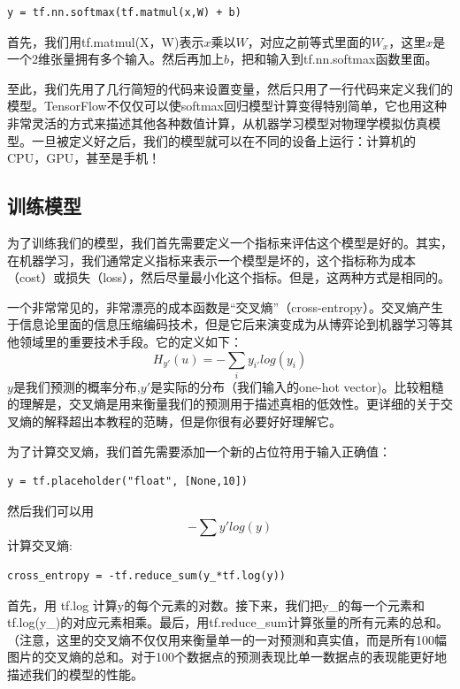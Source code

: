 \documentclass[a4paper,11pt,twoside]{ctexbook}
\begin{document}
\begin{lstlisting}
y = tf.nn.softmax(tf.matmul(x,W) + b)
\end{lstlisting}

首先，我们用tf.matmul(X，W)表示$x$乘以$W$，对应之前等式里面的$W_x$，这里$x$是一个2维张量拥有多个输入。然后再加上$b$，把和输入到tf.nn.softmax函数里面。

至此，我们先用了几行简短的代码来设置变量，然后只用了一行代码来定义我们的模型。TensorFlow不仅仅可以使softmax回归模型计算变得特别简单，它也用这种非常灵活的方式来描述其他各种数值计算，从机器学习模型对物理学模拟仿真模型。一旦被定义好之后，我们的模型就可以在不同的设备上运行：计算机的CPU，GPU，甚至是手机！

\subsection{训练模型}
为了训练我们的模型，我们首先需要定义一个指标来评估这个模型是好的。其实，在机器学习，我们通常定义指标来表示一个模型是坏的，这个指标称为成本（cost）或损失（loss），然后尽量最小化这个指标。但是，这两种方式是相同的。

一个非常常见的，非常漂亮的成本函数是“交叉熵”（cross-entropy）。交叉熵产生于信息论里面的信息压缩编码技术，但是它后来演变成为从博弈论到机器学习等其他领域里的重要技术手段。它的定义如下：
\begin{equation}
H_{y'}(u) = -\sum_i{y_{i'}log(y_i)}
\end{equation}
$y$是我们预测的概率分布,$y'$是实际的分布（我们输入的one-hot vector)。比较粗糙的理解是，交叉熵是用来衡量我们的预测用于描述真相的低效性。更详细的关于交叉熵的解释超出本教程的范畴，但是你很有必要好好理解它。

为了计算交叉熵，我们首先需要添加一个新的占位符用于输入正确值：
\begin{lstlisting}
y = tf.placeholder("float", [None,10])
\end{lstlisting}
然后我们可以用
\begin{equation}
-\sum{y'log(y)}
\end{equation}
计算交叉熵:

\begin{lstlisting}
cross_entropy = -tf.reduce_sum(y_*tf.log(y))
\end{lstlisting}

首先，用 tf.log 计算y的每个元素的对数。接下来，我们把y\_的每一个元素和tf.log(y\_)的对应元素相乘。最后，用tf.reduce\_sum计算张量的所有元素的总和。（注意，这里的交叉熵不仅仅用来衡量单一的一对预测和真实值，而是所有100幅图片的交叉熵的总和。对于100个数据点的预测表现比单一数据点的表现能更好地描述我们的模型的性能。
\end{document}
